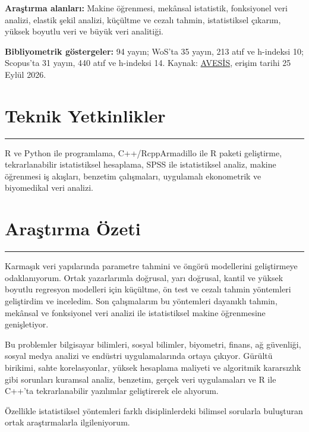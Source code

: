 \documentclass[10pt,a4paper]{article}
\newlength{\spacebox}
\newcommand{\sepspace}{\vspace*{0.65em}}		%
\newcommand{\NewPart}[2]{%
	\Needspace{7\baselineskip}%
	\vspace{0.45em}%
	\section*{\sffamily\large\bfseries\color{MidnightBlue}#1 #2}%
	\vspace{-0.7em}\noindent\color{MidnightBlue}\rule{\textwidth}{0.55pt}\color{Black}\vspace{0.25em}}
\newcommand{\PersonalEntry}[2]{
		\noindent\hangindent=2em\hangafter=0 %
		\parbox{\spacebox}{        %
		\textit{#1}}		       %
		\hspace{1.5em} #2 \par}    %
\begin{document}
\sepspace
\noindent\textbf{Araştırma alanları:} Makine öğrenmesi, mekânsal istatistik, fonksiyonel veri analizi, elastik şekil analizi, küçültme ve cezalı tahmin, istatistiksel çıkarım, yüksek boyutlu veri ve büyük veri analitiği.

\sepspace
\noindent\textbf{Bibliyometrik göstergeler:} 94 yayın; WoS'ta 35 yayın, 213 atıf ve h-indeksi 10; Scopus'ta 31 yayın, 440 atıf ve h-indeksi 14. Kaynak: \href{https://avesis.inonu.edu.tr/bahadir.yuzbasi}{AVESİS}, erişim tarihi 25 Eylül 2026.

 \NewPart{Teknik Yetkinlikler}{}
R ve Python ile programlama, C++/RcppArmadillo ile R paketi geliştirme, tekrarlanabilir istatistiksel hesaplama, SPSS ile istatistiksel analiz, makine öğrenmesi iş akışları, benzetim çalışmaları, uygulamalı ekonometrik ve biyomedikal veri analizi.




 \NewPart{Araştırma Özeti}{}
Karmaşık veri yapılarında parametre tahmini ve öngörü modellerini geliştirmeye odaklanıyorum. Ortak yazarlarımla doğrusal, yarı doğrusal, kantil ve yüksek boyutlu regresyon modelleri için küçültme, ön test ve cezalı tahmin yöntemleri geliştirdim ve inceledim. Son çalışmalarım bu yöntemleri dayanıklı tahmin, mekânsal ve fonksiyonel veri analizi ile istatistiksel makine öğrenmesine genişletiyor.

Bu problemler bilgisayar bilimleri, sosyal bilimler, biyometri, finans, ağ güvenliği, sosyal medya analizi ve endüstri uygulamalarında ortaya çıkıyor. Gürültü birikimi, sahte korelasyonlar, yüksek hesaplama maliyeti ve algoritmik kararsızlık gibi sorunları kuramsal analiz, benzetim, gerçek veri uygulamaları ve R ile C++'ta tekrarlanabilir yazılımlar geliştirerek ele alıyorum.

Özellikle istatistiksel yöntemleri farklı disiplinlerdeki bilimsel sorularla buluşturan ortak araştırmalarla ilgileniyorum.



\end{document}
